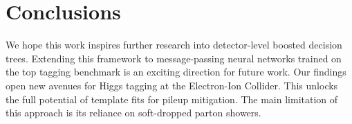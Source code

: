 \section{Conclusions}\label{sec:conclusions}

We hope this work inspires further research into detector-level boosted
decision trees. Extending this framework to message-passing neural
networks trained on the top tagging benchmark is an exciting direction
for future work. Our findings open new avenues for Higgs tagging at the
Electron-Ion Collider. This unlocks the full potential of template fits
for pileup mitigation. The main limitation of this approach is its
reliance on soft-dropped parton showers.

